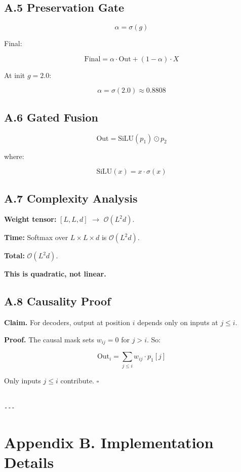 \subsection{A.5 Preservation Gate}

\[
\alpha = \sigma(g)
\tag{A.7}
\]

Final:

\[
\text{Final} = \alpha \cdot \text{Out} + (1 - \alpha) \cdot X
\tag{A.8}
\]

At init $g = 2.0$:

\[
\alpha = \sigma(2.0) \approx 0.8808
\tag{A.9}
\]

\subsection{A.6 Gated Fusion}

\[
\text{Out} = \text{SiLU}(p_1) \odot p_2
\tag{A.10}
\]

where:

\[
\text{SiLU}(x) = x \cdot \sigma(x)
\tag{A.11}
\]

\subsection{A.7 Complexity Analysis}

\textbf{Weight tensor:} $[L, L, d]$ $\to$ $\mathcal{O}(L^2 d)$.

\textbf{Time:} Softmax over $L \times L \times d$ is $\mathcal{O}(L^2 d)$.

\textbf{Total:} $\mathcal{O}(L^2 d)$.

\textbf{This is quadratic, not linear.}

\subsection{A.8 Causality Proof}

\textbf{Claim.} For decoders, output at position $i$ depends only on inputs at 
$j \leq i$.

\textbf{Proof.} The causal mask sets $w_{ij} = 0$ for $j > i$. So:

\[
\text{Out}_i = \sum_{j \leq i} w_{ij} \cdot p_1[j]
\tag{A.12}
\]

Only inputs $j \leq i$ contribute. $\square$
\begin{lstlisting}

---
\end{lstlisting}

\section{Appendix B. Implementation Details}

